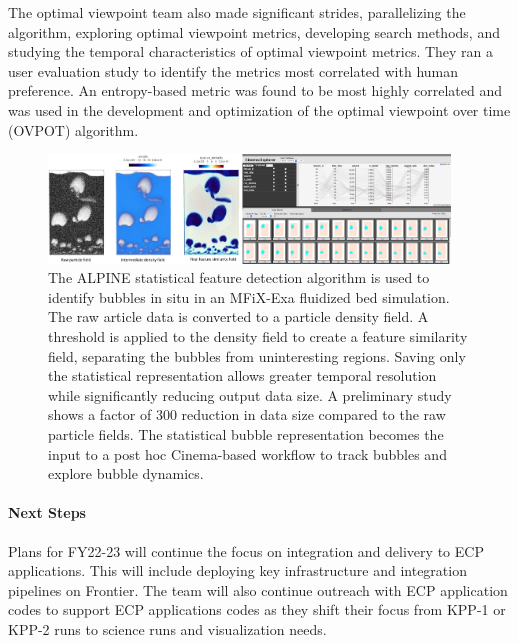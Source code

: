 
The optimal viewpoint team also made significant strides, parallelizing the algorithm, exploring optimal viewpoint metrics, developing search methods, and studying the temporal characteristics of optimal viewpoint metrics.  They ran a user evaluation study to identify the metrics most correlated with human preference.  An entropy-based metric was found to be most highly correlated and was used in the development and optimization of the optimal viewpoint over time (OVPOT) algorithm.  

\begin{figure}[htb]
	\begin{center}
		\includegraphics[width=0.95\textwidth]{projects/2.3.4-DataViz/2.3.4.16-ALPINE-ZFP/alpine-cinema-mfixexa-workflow.png}
		\caption{The ALPINE statistical feature detection algorithm is used to identify bubbles in situ in an MFiX-Exa fluidized bed simulation.  The raw article data is converted to a particle density field.  A threshold is applied to the density field to create a feature similarity field, separating the  bubbles from uninteresting regions.  Saving only the statistical representation allows greater temporal resolution while significantly reducing output data size.  A preliminary study shows a factor of 300 reduction in data size compared to the raw particle fields. The statistical bubble representation becomes the input to a post hoc Cinema-based workflow to track bubbles and explore bubble dynamics. }
		\label{fig:alpine-statistical-feature}
	\end{center}
\end{figure}

\paragraph{Next Steps}

Plans for FY22-23 will continue the focus on integration and delivery to ECP applications.  This will include deploying key infrastructure and integration pipelines on Frontier. The team will also continue outreach with ECP application codes to support ECP applications codes as they shift their focus from  KPP-1 or KPP-2 runs to science runs and visualization needs.  

